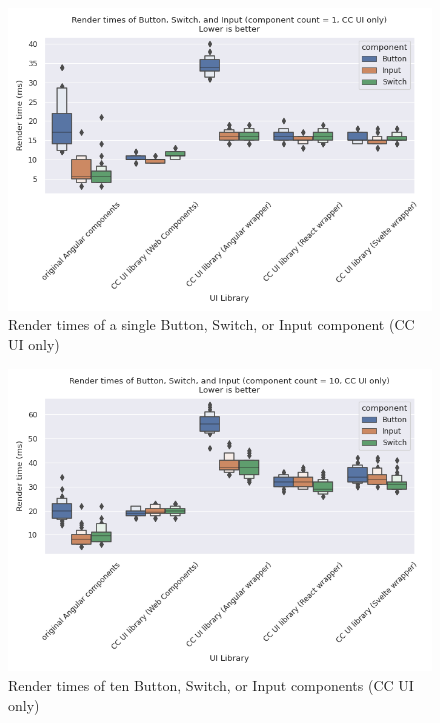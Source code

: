 \begin{figure}[h]
	\includegraphics[width=\columnwidth]{plots/render-time-cow-1.png}
	\caption{Render times of a single Button, Switch, or Input component (CC UI only)}
	\label{fig:results:render-time-cow-1}
	\centering
\end{figure}

\begin{figure}[h]
	\includegraphics[width=\columnwidth]{plots/render-time-cow-10.png}
	\caption{Render times of ten Button, Switch, or Input components (CC UI only)}
	\label{fig:results:render-time-cow-10}
	\centering
\end{figure}

